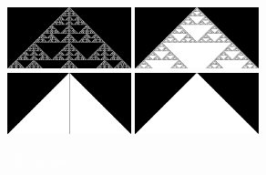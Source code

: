 \documentclass{article}
\newcommand{\todo}[1]{\colorbox{WildStrawberry}{\textcolor{white}{#1}}}
\begin{document}
\begin{figure}
    \includegraphics[width=0.32\textwidth]{ca-rules/double1-close/rule-150.png}%
    \hspace{0.01\textwidth}%
    \includegraphics[width=0.32\textwidth]{ca-rules/double1-close/rule-182.png}\\%
    \vspace{0.01\textwidth}%
    \includegraphics[width=0.32\textwidth]{ca-rules/double1-close/rule-222.png}%
    \hspace{0.01\textwidth}%
    \includegraphics[width=0.32\textwidth]{ca-rules/double1-close/rule-254.png}%
    \hspace{0.01\textwidth}%
    \caption{\todo{fill caption}}
    \label{fig:supplement:ca-rules-double-close}
\end{figure}
\end{document}
